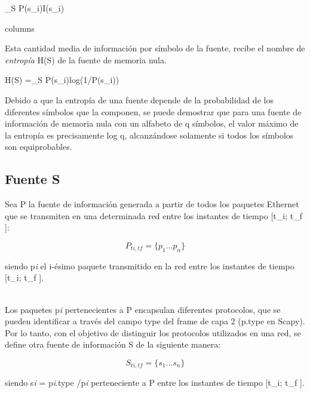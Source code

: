 \documentclass[11pt,a4paper]{article}
\begin{document}
\begin{center}
		\sum_{S} P(s_{i})I(s_{i})  \begin{tabular}{columns}
			   
		\end{tabular}

\end{center}
\begin{flushleft}
	Esta cantidad media de información por símbolo de la fuente, recibe el nombre de \textit{entropía} H(S) de la fuente de memoria nula.
\end{flushleft}

\begin{center}
		H(S) =\sum_{S} P(s_{i})log(1/P(s_{i})) 

\end{center}
	
Debido a que la entropía de una fuente depende de la probabilidad de los diferentes símbolos que la componen, se puede demostrar que para una fuente de información de memoria nula con un alfabeto de q símbolos, el valor máximo de la entropía es precisamente log q, alcanzándose solamente si todos los símbolos son equiprobables.


\subsection{Fuente S}

Sea P la fuente de información generada a partir de todos los paquetes Ethernet que se transmiten en una determinada red entre los instantes de tiempo [t_{i}; t_{f} ]:

	\[ P_{ti,tf} = \{p_{1}...p_{n}\}\] 

\begin{flushleft}
	siendo p{\scriptsize \textit{i}} el i-ésimo paquete transmitido en la red entre los instantes de tiempo [t_{i}; t_{f} ].
\end{flushleft}
\\
Los paquetes p{\scriptsize \textit{i}} pertenecientes a P encapsulan diferentes protocolos, que se pueden identificar a través del campo type del frame de capa 2 (p.type en Scapy). Por lo tanto, con el objetivo de distinguir los protocolos utilizados en una red, se define otra fuente de información S de la siguiente manera:

\[ S_{ti,tf} = \{s_{1}...s_{n}\}\] 

\begin{flushleft}
	siendo s{\scriptsize \textit{i}} = p{\scriptsize \textit{i}}.type /p{\scriptsize \textit{i}} perteneciente a P entre los instantes de tiempo [t_{i}; t_{f} ].
\end{flushleft}
\end{document}
